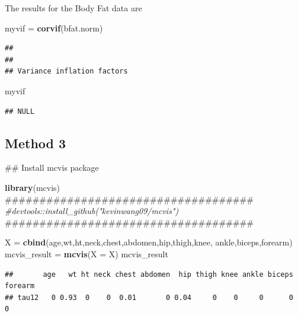 \documentclass[]{article}
\newenvironment{Shaded}{\begin{snugshade}}{\end{snugshade}}
\newcommand{\KeywordTok}[1]{\textcolor[rgb]{0.13,0.29,0.53}{\textbf{#1}}}
\newcommand{\DataTypeTok}[1]{\textcolor[rgb]{0.13,0.29,0.53}{#1}}
\newcommand{\StringTok}[1]{\textcolor[rgb]{0.31,0.60,0.02}{#1}}
\newcommand{\CommentTok}[1]{\textcolor[rgb]{0.56,0.35,0.01}{\textit{#1}}}
\newcommand{\NormalTok}[1]{#1}
\begin{document}
The results for the Body Fat data are

\begin{Shaded}
\begin{Highlighting}[]
\NormalTok{myvif =}\StringTok{ }\KeywordTok{corvif}\NormalTok{(bfat.norm)}
\end{Highlighting}
\end{Shaded}

\begin{verbatim}
## 
## 
## Variance inflation factors
\end{verbatim}

\begin{Shaded}
\begin{Highlighting}[]
\NormalTok{myvif}
\end{Highlighting}
\end{Shaded}

\begin{verbatim}
## NULL
\end{verbatim}

\subsection{Method 3}\label{method-3}

\begin{Shaded}
\begin{Highlighting}[]
\NormalTok{## Install mcvis package}

\KeywordTok{library}\NormalTok{(mcvis)}
\NormalTok{####################################}
\CommentTok{#devtools::install_github("kevinwang09/mcvis")}
\NormalTok{####################################}
\end{Highlighting}
\end{Shaded}

\begin{Shaded}
\begin{Highlighting}[]
\NormalTok{X =}\StringTok{ }\KeywordTok{cbind}\NormalTok{(age,wt,ht,neck,chest,abdomen,hip,thigh,knee,}
\NormalTok{         ankle,biceps,forearm)}
\NormalTok{mcvis_result =}\StringTok{ }\KeywordTok{mcvis}\NormalTok{(}\DataTypeTok{X =}\NormalTok{ X)}
\NormalTok{mcvis_result}
\end{Highlighting}
\end{Shaded}

\begin{verbatim}
##       age   wt ht neck chest abdomen  hip thigh knee ankle biceps forearm
## tau12   0 0.93  0    0  0.01       0 0.04     0    0     0      0       0
\end{verbatim}
\end{document}
